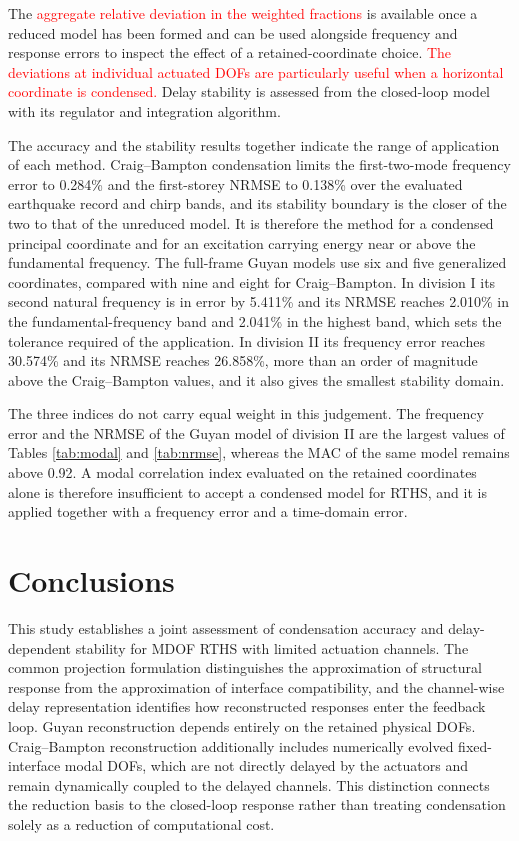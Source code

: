 \documentclass[a4paper,fleqn,review,12pt]{cas-sc}
\newcommand{\rev}[1]{\textcolor{red}{#1}}
\begin{document}
The \rev{aggregate relative deviation in the weighted fractions} is available once a reduced model has been formed and can be used alongside frequency and response errors to inspect the effect of a retained-coordinate choice. \rev{The deviations at individual actuated DOFs are particularly useful when a horizontal coordinate is condensed.} Delay stability is assessed from the closed-loop model with its regulator and integration algorithm.

The accuracy and the stability results together indicate the range of application of each method. Craig--Bampton condensation limits the first-two-mode frequency error to 0.284\% and the first-storey NRMSE to 0.138\% over the evaluated earthquake record and chirp bands, and its stability boundary is the closer of the two to that of the unreduced model. It is therefore the method for a condensed principal coordinate and for an excitation carrying energy near or above the fundamental frequency. The full-frame Guyan models use six and five generalized coordinates, compared with nine and eight for Craig--Bampton. In division I its second natural frequency is in error by 5.411\% and its NRMSE reaches 2.010\% in the fundamental-frequency band and 2.041\% in the highest band, which sets the tolerance required of the application. In division II its frequency error reaches 30.574\% and its NRMSE reaches 26.858\%, more than an order of magnitude above the Craig--Bampton values, and it also gives the smallest stability domain.

The three indices do not carry equal weight in this judgement. The frequency error and the NRMSE of the Guyan model of division II are the largest values of Tables \ref{tab:modal} and \ref{tab:nrmse}, whereas the MAC of the same model remains above 0.92. A modal correlation index evaluated on the retained coordinates alone is therefore insufficient to accept a condensed model for RTHS, and it is applied together with a frequency error and a time-domain error.




\section{Conclusions} \label{sec6}

This study establishes a joint assessment of condensation accuracy and delay-dependent stability for MDOF RTHS with limited actuation channels. The common projection formulation distinguishes the approximation of structural response from the approximation of interface compatibility, and the channel-wise delay representation identifies how reconstructed responses enter the feedback loop. Guyan reconstruction depends entirely on the retained physical DOFs. Craig--Bampton reconstruction additionally includes numerically evolved fixed-interface modal DOFs, which are not directly delayed by the actuators and remain dynamically coupled to the delayed channels. This distinction connects the reduction basis to the closed-loop response rather than treating condensation solely as a reduction of computational cost.
\end{document}
